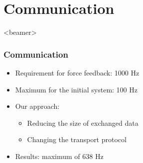 \section{Communication}

\begin{frame}<beamer>
\frametitle{Communication}


  \begin{itemize}
  \item<1-> Requirement for force feedback: 1000 Hz

  \item<2-> Maximum for the initial system: 100 Hz
  \item<3-> Our approach:
      \begin{itemize}
        \item<4-> Reducing the size of exchanged data
        \item<5-> Changing the transport protocol
      \end{itemize}
  \item<6-> Results: maximum of 638 Hz
  \end{itemize}

\end{frame}




